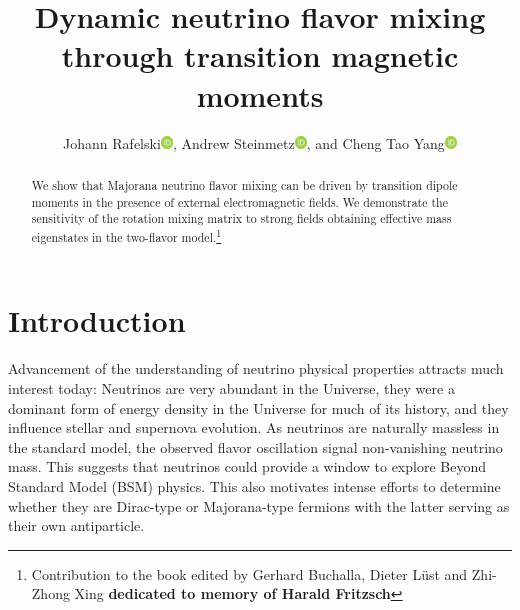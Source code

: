 \documentclass{ws-ijmpa}
\newcommand{\orcidicon}{\includegraphics[width=0.32cm]{orcid.pdf}}
\newcommand{\orc}[1]{\href{https://orcid.org/#1}{\orcidicon}}
\newcommand{\orcA}{0000-0001-8217-1484}
\newcommand{\orcB}{0000-0001-5038-8427}
\newcommand{\orcC}{0000-0001-5474-2649}
\begin{document}

%
\catchline{}{}{}{}{}
%

\title{Dynamic neutrino flavor mixing through transition magnetic moments}

\author{Johann Rafelski\orc{\orcA}, Andrew Steinmetz\orc{\orcC}, and Cheng Tao Yang\orc{\orcB}}

\address{Department of Physics, The University of Arizona, Tucson, AZ 85721, USA}

\maketitle

\begin{history}
\end{history}

\begin{abstract}
We show that Majorana neutrino flavor mixing can be driven by transition dipole moments in the presence of external electromagnetic fields. We demonstrate the sensitivity of the rotation mixing matrix to strong fields obtaining effective mass eigenstates in the two-flavor model.\footnote{Contribution to the book edited by Gerhard Buchalla, Dieter L\"ust
and Zhi-Zhong Xing \textbf{dedicated to memory of Harald Fritzsch}}

\end{abstract}


\section{Introduction}
\label{sec:intro}

Advancement of the understanding of neutrino physical properties attracts much interest today: Neutrinos are very abundant in the Universe, they were a dominant form of energy density in the Universe for much of its history, and they influence stellar and supernova evolution. As neutrinos are naturally massless in the standard model, the observed flavor oscillation signal non-vanishing neutrino mass. This suggests that neutrinos could provide a window to explore Beyond Standard Model (BSM) physics. This also motivates intense efforts to determine whether they are Dirac-type or Majorana-type fermions with the latter serving as their own antiparticle.
\end{document}
